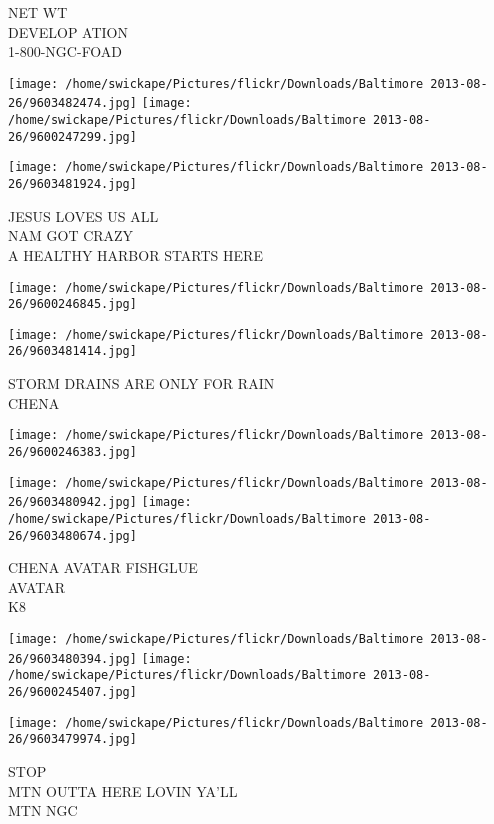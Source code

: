 \documentclass[10pt,letterpaper]{article}
\begin{document}
NET WT\\
DEVELOP ATION\\
1{-}800{-}NGC{-}FOAD\\
\pagebreak

\texttt{[image: /home/swickape/Pictures/flickr/Downloads/Baltimore 2013-08-26/9603482474.jpg]}
\texttt{[image: /home/swickape/Pictures/flickr/Downloads/Baltimore 2013-08-26/9600247299.jpg]}

\texttt{[image: /home/swickape/Pictures/flickr/Downloads/Baltimore 2013-08-26/9603481924.jpg]}

JESUS LOVES US ALL\\
NAM GOT CRAZY\\
A HEALTHY HARBOR STARTS HERE\\
\pagebreak

\texttt{[image: /home/swickape/Pictures/flickr/Downloads/Baltimore 2013-08-26/9600246845.jpg]}

\vspace{0.25in}
\texttt{[image: /home/swickape/Pictures/flickr/Downloads/Baltimore 2013-08-26/9603481414.jpg]}

STORM DRAINS ARE ONLY FOR RAIN\\
CHENA\\
\pagebreak

\texttt{[image: /home/swickape/Pictures/flickr/Downloads/Baltimore 2013-08-26/9600246383.jpg]}

\vspace{0.25in}
\texttt{[image: /home/swickape/Pictures/flickr/Downloads/Baltimore 2013-08-26/9603480942.jpg]}
\texttt{[image: /home/swickape/Pictures/flickr/Downloads/Baltimore 2013-08-26/9603480674.jpg]}

CHENA AVATAR FISHGLUE\\
AVATAR\\
K8\\
\pagebreak

\texttt{[image: /home/swickape/Pictures/flickr/Downloads/Baltimore 2013-08-26/9603480394.jpg]}
\texttt{[image: /home/swickape/Pictures/flickr/Downloads/Baltimore 2013-08-26/9600245407.jpg]}

\texttt{[image: /home/swickape/Pictures/flickr/Downloads/Baltimore 2013-08-26/9603479974.jpg]}

STOP\\
MTN OUTTA HERE LOVIN YA'LL\\
MTN NGC\\
\pagebreak
\end{document}
